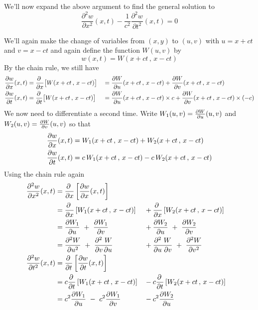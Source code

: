 \begin{eg}
We'll now expand the above argument to find the general solution 
to 
\begin{equation*}
\frac{\partial^2 w}{\partial x^2}(x,t)
         -\frac{1}{c^2}\frac{\partial^2 w}{\partial t^2}(x,t)=0
\end{equation*}

 We'll again make the change of variables from $(x,y)$
to $(u,v)$ with $u=x+ct$ and $v=x-ct$ and again define
the function $W(u,v)$ by
\begin{equation*}
w(x,t) = W(x+ct\,,\,x-ct)
\end{equation*} 
By the chain rule, we still have
\begin{alignat*}{3}
\pdiff{w}{x}(x,t)
&=\pdiff{}{x}\big[W(x+ct\,,\,x-ct) \big]
&&= \pdiff{W}{u}(x+ct\,,\,x-ct) + \pdiff{W}{v}(x+ct\,,\,x-ct)  \\
\pdiff{w}{t}(x,t)
&=\pdiff{}{t}\big[W(x+ct\,,\,x-ct) \big]
&&= \pdiff{W}{u}(x+ct\,,\,x-ct)\times c 
             + \pdiff{W}{v}(x+ct\,,\,x-ct)\times(-c)  
\end{alignat*}
We now need to differentiate a second time. Write
$W_1(u,v)=\pdiff{W}{u}(u,v)$ and $W_2(u,v)=\pdiff{W}{v}(u,v)$
so that
\begin{align*}
\pdiff{w}{x}(x,t)
&= W_1(x+ct\,,\,x-ct) + W_2(x+ct\,,\,x-ct)  \\
\pdiff{w}{t}(x,t)
&= c\,W_1(x+ct\,,\,x-ct) -c\,W_2(x+ct\,,\,x-ct)
\end{align*}
Using the chain rule again
\begin{alignat*}{3}
\frac{\partial^2 w}{\partial x^2}(x,t)
&=\pdiff{}{x}\left[\pdiff{w}{x}(x,t)\right] \\
&=\pdiff{}{x}\left[W_1(x+ct\,,\,x-ct)\right]
  &&+ \pdiff{}{x}\left[W_2(x+ct\,,\,x-ct)\right] \\
&=\pdiff{W_1}{u}  
     \ +\  \pdiff{W_1}{v}
   &&+ \pdiff{W_2}{u}
     \ +\  \pdiff{W_2}{v}  \\
&=\frac{\partial^2 W}{\partial u^2}  
     \ +\  \frac{\partial^2\ W}{\partial v\,\partial u}
   &&+ \frac{\partial^2\ W}{\partial u\ \partial v}
     \ +\  \frac{\partial^2 W}{\partial v^2}  \\
\frac{\partial^2 w}{\partial t^2}(x,t)
&=\pdiff{}{t}\left[\pdiff{w}{t}(x,t)\right] \\
&=c\pdiff{}{t}\left[W_1(x+ct\,,\,x-ct)\right]
  &&-c \pdiff{}{t}\left[W_2(x+ct\,,\,x-ct)\right] \\
&=c^2\pdiff{W_1}{u}  
     \ -\  c^2\pdiff{W_1}{v}
   && -c^2\pdiff{W_2}{u}

\end{alignat*}
\end{eg}
